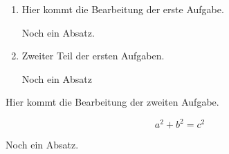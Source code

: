\documentclass[sheet=3, task=6, prefix, maincolor=cispa-dark]{exercise}
\begin{document}
    \begin{enumerate}
      \item Hier kommt die Bearbeitung der erste Aufgabe.
      
        Noch ein Absatz.
        
      \item Zweiter Teil der ersten Aufgaben.
      
        Noch ein Absatz
    \end{enumerate}
  
    Hier kommt die Bearbeitung der zweiten Aufgabe.
    
    \[ a^2+b^2=c^2 \]
    
    Noch ein Absatz.
\end{document}
